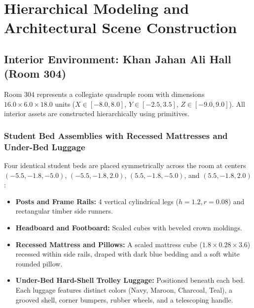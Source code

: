 \documentclass[11pt,a4paper]{article}
\begin{document}
\section{Hierarchical Modeling and Architectural Scene Construction}

\subsection{Interior Environment: Khan Jahan Ali Hall (Room 304)}
Room 304 represents a collegiate quadruple room with dimensions $16.0 \times 6.0 \times 18.0$ units ($X \in [-8.0, 8.0]$, $Y \in [-2.5, 3.5]$, $Z \in [-9.0, 9.0]$). All interior assets are constructed hierarchically using primitives.

\subsubsection{Student Bed Assemblies with Recessed Mattresses and Under-Bed Luggage}
Four identical student beds are placed symmetrically across the room at centers $(-5.5, -1.8, -5.0)$, $(-5.5, -1.8, 2.0)$, $(5.5, -1.8, -5.0)$, and $(5.5, -1.8, 2.0)$:
\begin{itemize}[leftmargin=1.2em, itemsep=0.5pt, topsep=0.5pt]
    \item \textbf{Posts and Frame Rails:} 4 vertical cylindrical legs ($h = 1.2, r = 0.08$) and rectangular timber side runners.
    \item \textbf{Headboard and Footboard:} Scaled cubes with beveled crown moldings.
    \item \textbf{Recessed Mattress and Pillows:} A scaled mattress cube ($1.8 \times 0.28 \times 3.6$) recessed within side rails, draped with dark blue bedding and a soft white rounded pillow.
    \item \textbf{Under-Bed Hard-Shell Trolley Luggage:} Positioned beneath each bed. Each luggage features distinct colors (Navy, Maroon, Charcoal, Teal), a grooved shell, corner bumpers, rubber wheels, and a telescoping handle.
\end{itemize}
\end{document}
